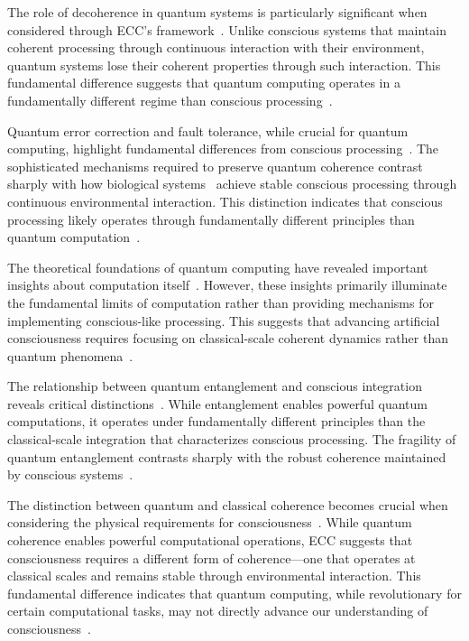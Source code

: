 The role of decoherence in quantum systems is particularly significant when considered through ECC's framework~\cite{Arute2019,pinotsis2023cytoelectric}. Unlike conscious systems that maintain coherent processing through continuous interaction with their environment, quantum systems lose their coherent properties through such interaction. This fundamental difference suggests that quantum computing operates in a fundamentally different regime than conscious processing~\cite{Bernstein2018,Friston2009}.

Quantum error correction and fault tolerance, while crucial for quantum computing, highlight fundamental differences from conscious processing~\cite{Harrow2020,pockett2012electromagnetic}. The sophisticated mechanisms required to preserve quantum coherence contrast sharply with how biological systems~ achieve stable conscious processing through continuous environmental interaction. This distinction indicates that conscious processing likely operates through fundamentally different principles than quantum computation~\cite{Kitaev2018,varela2017embodied}.

The theoretical foundations of quantum computing have revealed important insights about computation itself~\cite{Montanaro2021,anderson2024physical}. However, these insights primarily illuminate the fundamental limits of computation rather than providing mechanisms for implementing conscious-like processing. This suggests that advancing artificial consciousness requires focusing on classical-scale coherent dynamics rather than quantum phenomena~\cite{Nielsen2020,abramsky2012logical}.

The relationship between quantum entanglement and conscious integration reveals critical distinctions~\cite{Svore2020,frankish2016illusionism}. While entanglement enables powerful quantum computations, it operates under fundamentally different principles than the classical-scale integration that characterizes conscious processing. The fragility of quantum entanglement contrasts sharply with the robust coherence maintained by conscious systems~\cite{Terhal2018,juarrero2023context}.

The distinction between quantum and classical coherence becomes crucial when considering the physical requirements for consciousness~\cite{Aaronson2021a,dennett1992time}. While quantum coherence enables powerful computational operations, ECC suggests that consciousness requires a different form of coherence—one that operates at classical scales and remains stable through environmental interaction. This fundamental difference indicates that quantum computing, while revolutionary for certain computational tasks, may not directly advance our understanding of consciousness~\cite{Arute2019,varela1996neurophenomenology}.

